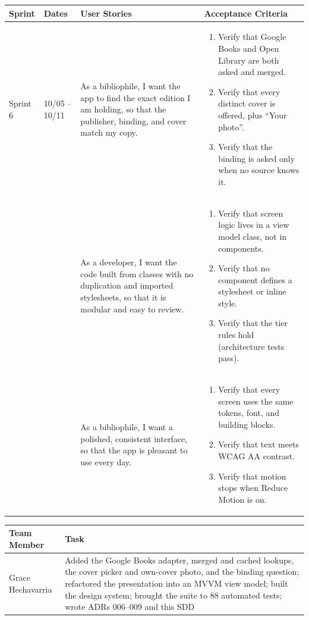 \documentclass[12pt]{article}
\begin{document}
\noindent\begin{minipage}{\linewidth}

\vspace{0.5em}
\noindent
\begin{tabular}{|L{1.2cm}|L{1.8cm}|L{5.2cm}|L{6.3cm}|}
\hline
\textbf{Sprint} & \textbf{Dates} & \textbf{User Stories} & \textbf{Acceptance Criteria} \\
\hline
Sprint 6 & 10/05 -- 10/11 &
As a bibliophile, I want the app to find the exact edition I am holding, so that the publisher, binding, and cover match my copy. &
\begin{enumerate}
    \item Verify that Google Books and Open Library are both asked and merged.
    \item Verify that every distinct cover is offered, plus ``Your photo''.
    \item Verify that the binding is asked only when no source knows it.
\end{enumerate} \\
& &
As a developer, I want the code built from classes with no duplication and imported stylesheets, so that it is modular and easy to review. &
\begin{enumerate}
    \item Verify that screen logic lives in a view model class, not in components.
    \item Verify that no component defines a stylesheet or inline style.
    \item Verify that the tier rules hold (architecture tests pass).
\end{enumerate} \\
& &
As a bibliophile, I want a polished, consistent interface, so that the app is pleasant to use every day. &
\begin{enumerate}
    \item Verify that every screen uses the same tokens, font, and building blocks.
    \item Verify that text meets WCAG AA contrast.
    \item Verify that motion stops when Reduce Motion is on.
\end{enumerate} \\
\hline
\end{tabular}

\vspace{0.5em}
\noindent
\begin{tabular}{|L{3.4cm}|L{11.6cm}|}
\hline
\textbf{Team Member} & \textbf{Task} \\
\hline
Grace Hechavarria & Added the Google Books adapter, merged and cached lookups, the cover picker and own-cover photo, and the binding question; refactored the presentation into an MVVM view model; built the design system; brought the suite to 88 automated tests; wrote ADRs 006--009 and this SDD \\
\hline
\end{tabular}
\end{minipage}
\end{document}

